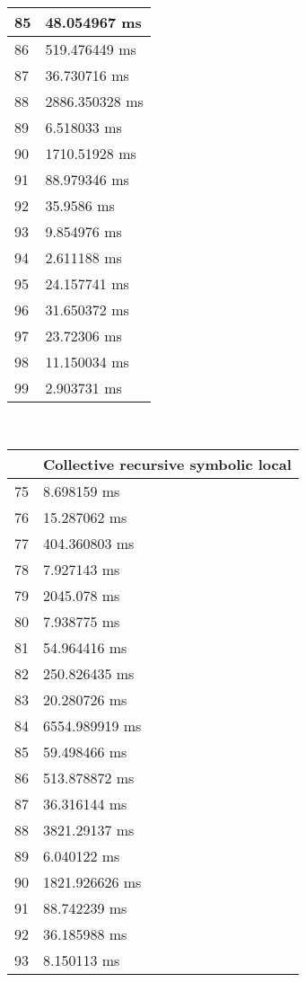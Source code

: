 \begin{multicols}{2}
\begin{tabular}{|l|l|}
		85 & 48.054967 ms \\ \hline
		86 & 519.476449 ms \\ \hline
		87 & 36.730716 ms \\ \hline
		88 & 2886.350328 ms \\ \hline
		89 & 6.518033 ms \\ \hline
		90 & 1710.51928 ms \\ \hline
		91 & 88.979346 ms \\ \hline
		92 & 35.9586 ms \\ \hline
		93 & 9.854976 ms \\ \hline
		94 & 2.611188 ms \\ \hline
		95 & 24.157741 ms \\ \hline
		96 & 31.650372 ms \\ \hline
		97 & 23.72306 ms \\ \hline
		98 & 11.150034 ms \\ \hline
		99 & 2.903731 ms \\ \hline
	\end{tabular}\\
	\begin{tabular}{|l|l|}
		\hline
		& Collective recursive symbolic local \\ \hline
		75 & 8.698159 ms \\ \hline
		76 & 15.287062 ms \\ \hline
		77 & 404.360803 ms \\ \hline
		78 & 7.927143 ms \\ \hline
		79 & 2045.078 ms \\ \hline
		80 & 7.938775 ms \\ \hline
		81 & 54.964416 ms \\ \hline
		82 & 250.826435 ms \\ \hline
		83 & 20.280726 ms \\ \hline
		84 & 6554.989919 ms \\ \hline
		85 & 59.498466 ms \\ \hline
		86 & 513.878872 ms \\ \hline
		87 & 36.316144 ms \\ \hline
		88 & 3821.29137 ms \\ \hline
		89 & 6.040122 ms \\ \hline
		90 & 1821.926626 ms \\ \hline
		91 & 88.742239 ms \\ \hline
		92 & 36.185988 ms \\ \hline
		93 & 8.150113 ms \\ \hline

\end{tabular}
\end{multicols}
